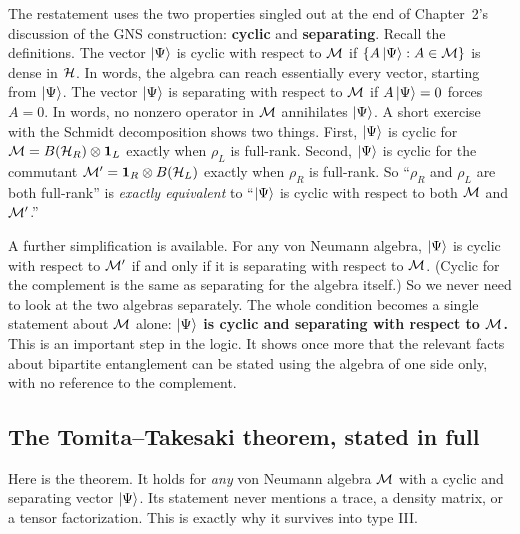 The restatement uses the two properties singled out at the end of Chapter~2's discussion of the GNS
construction: \textbf{cyclic} and \textbf{separating}. Recall the definitions. The vector $\ket\Psi$ is cyclic
with respect to $\mathcal{M}$ if $\{A\ket\Psi : A\in\mathcal{M}\}$ is dense in $\mathcal{H}$. In words, the algebra can reach
essentially every vector, starting from $\ket\Psi$. The vector $\ket\Psi$ is separating with respect to $\mathcal{M}$
if $A\ket\Psi=0$ forces $A=0$. In words, no nonzero operator in $\mathcal{M}$ annihilates $\ket\Psi$. A short exercise
with the Schmidt decomposition shows two things. First, $\ket\Psi$ is cyclic for $\mathcal{M}=B(\mathcal{H}_R)\otimes\mathbf{1}_L$
exactly when $\rho_L$ is full-rank. Second, $\ket\Psi$ is cyclic for the commutant $\mathcal{M}'=\mathbf{1}_R\otimes B(\mathcal{H}_L)$
exactly when $\rho_R$ is full-rank. So ``$\rho_R$ and $\rho_L$ are both full-rank'' is \emph{exactly
equivalent} to ``$\ket\Psi$ is cyclic with respect to both $\mathcal{M}$ and $\mathcal{M}'$.''

A further simplification is available. For any von Neumann algebra, $\ket\Psi$ is cyclic with respect to $\mathcal{M}'$
if and only if it is separating with respect to $\mathcal{M}$. (Cyclic for the complement is the same as separating
for the algebra itself.) So we never need to look at the two algebras separately. The whole condition becomes a
single statement about $\mathcal{M}$ alone: \textbf{$\ket\Psi$ is cyclic and separating with respect to $\mathcal{M}$.} This is
an important step in the logic. It shows once more that the relevant facts about bipartite entanglement can be
stated using the algebra of one side only, with no reference to the complement.

\subsection*{The Tomita--Takesaki theorem, stated in full}

Here is the theorem. It holds for \emph{any} von Neumann algebra $\mathcal{M}$ with a cyclic and separating vector
$\ket\Psi$. Its statement never mentions a trace, a density matrix, or a tensor factorization. This is exactly
why it survives into type III.

